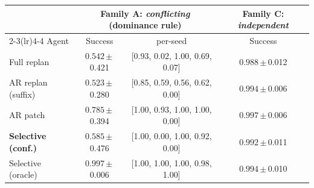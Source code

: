\begin{tabular}{@{}lccc@{}}
\toprule
& \multicolumn{2}{c}{Family A: \emph{conflicting} (dominance rule)} & Family C: \emph{independent} \\
\cmidrule(lr){2-3}\cmidrule(lr){4-4}
Agent & Success & per-seed & Success \\
\midrule
Full replan & $0.542$\,{\scriptsize$\pm$\,0.421} & [0.93, 0.02, 1.00, 0.69, 0.07] & $0.988$\,{\scriptsize$\pm$\,0.012} \\
AR replan (suffix) & $0.523$\,{\scriptsize$\pm$\,0.280} & [0.85, 0.59, 0.56, 0.62, 0.00] & $0.994$\,{\scriptsize$\pm$\,0.006} \\
AR patch & $0.785$\,{\scriptsize$\pm$\,0.394} & [1.00, 0.93, 1.00, 1.00, 0.00] & $0.997$\,{\scriptsize$\pm$\,0.006} \\
\textbf{Selective (conf.)} & $0.585$\,{\scriptsize$\pm$\,0.476} & [1.00, 0.00, 1.00, 0.92, 0.00] & $0.992$\,{\scriptsize$\pm$\,0.011} \\
Selective (oracle) & $0.997$\,{\scriptsize$\pm$\,0.006} & [1.00, 1.00, 1.00, 0.98, 1.00] & $0.994$\,{\scriptsize$\pm$\,0.010} \\
\bottomrule
\end{tabular}
